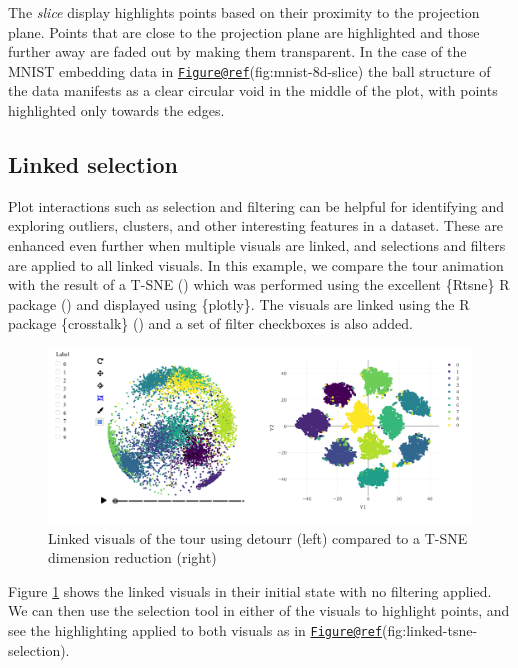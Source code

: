 The \emph{slice} display highlights points based on their proximity to
the projection plane. Points that are close to the projection plane are
highlighted and those further away are faded out by making them
transparent. In the case of the MNIST embedding data in
\href{mailto:Figure@ref}{\nolinkurl{Figure@ref}}(fig:mnist-8d-slice) the
ball structure of the data manifests as a clear circular void in the
middle of the plot, with points highlighted only towards the edges.

\hypertarget{sec:casestudylinked}{%
\subsection{Linked selection}\label{sec:casestudylinked}}

Plot interactions such as selection and filtering can be helpful for
identifying and exploring outliers, clusters, and other interesting
features in a dataset. These are enhanced even further when multiple
visuals are linked, and selections and filters are applied to all linked
visuals. In this example, we compare the tour animation with the result
of a T-SNE (\citet{van2008tsne}) which was performed using the excellent
\{Rtsne\} R package (\citet{van2015rtsne}) and displayed using
\{plotly\}. The visuals are linked using the R package \{crosstalk\}
(\citet{crosstalk}) and a set of filter checkboxes is also added.

\begin{Schunk}
\begin{figure}
\includegraphics[width=\textwidth]{figures/mnist/case-study-linked-brushing-full} \caption[Linked visuals of the tour using {detourr} (left) compared to a T-SNE dimension reduction (right)]{Linked visuals of the tour using {detourr} (left) compared to a T-SNE dimension reduction (right)}\label{fig:linked-tsne-full}
\end{figure}
\end{Schunk}

Figure \ref{fig:linked-tsne-full} shows the linked visuals in their
initial state with no filtering applied. We can then use the selection
tool in either of the visuals to highlight points, and see the
highlighting applied to both visuals as in
\href{mailto:Figure@ref}{\nolinkurl{Figure@ref}}(fig:linked-tsne-selection).


